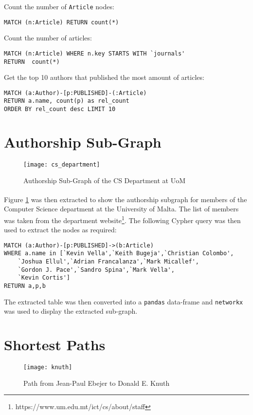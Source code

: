 Count the number of \texttt{Article} nodes:
\begin{verbatim}
MATCH (n:Article) RETURN count(*)
\end{verbatim}
Count the number of articles:
\begin{verbatim}
MATCH (n:Article) WHERE n.key STARTS WITH `journals' 
RETURN  count(*)
\end{verbatim}
Get the top 10 authors that published the most amount of articles:
\begin{verbatim}
MATCH (a:Author)-[p:PUBLISHED]-(:Article)
RETURN a.name, count(p) as rel_count
ORDER BY rel_count desc LIMIT 10
\end{verbatim}

\section{Authorship Sub-Graph}

\begin{figure}[!b]
	\centering
	\texttt{[image: cs\_department]}
	\caption[Department Sub-Graph]{Authorship Sub-Graph of the CS Department at UoM}
	\label{fig::cs_department}
\end{figure}

\paragraph{ }Figure \ref{fig::cs_department} was then extracted to show the authorship subgraph for members of the Computer Science department at the University of Malta. The list of members was taken from the department website\footnote{https://www.um.edu.mt/ict/cs/about/staff}. The following Cypher query was then used to extract the nodes as required:
\begin{verbatim}
MATCH (a:Author)-[p:PUBLISHED]->(b:Article)
WHERE a.name in [`Kevin Vella',`Keith Bugeja',`Christian Colombo',
    `Joshua Ellul',`Adrian Francalanza',`Mark Micallef',
    `Gordon J. Pace',`Sandro Spina',`Mark Vella',
    `Kevin Cortis']
RETURN a,p,b
\end{verbatim}
The extracted table was then converted into a \texttt{pandas} data-frame and \texttt{networkx} was used to display the extracted sub-graph.

\section{Shortest Paths}

\begin{figure}[!b]
	\centering
	\texttt{[image: knuth]}
	\caption[Shortest Path]{Path from Jean-Paul Ebejer to Donald E. Knuth}
	\label{fig::knuth}
\end{figure}


